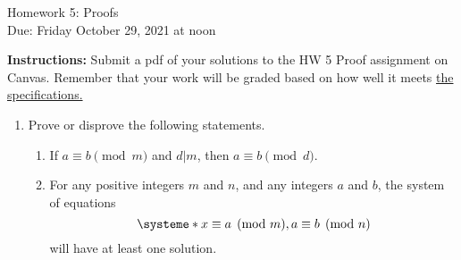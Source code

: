 \documentclass[10pt,a4paper]{article}
\begin{document}
\begin{center}
{\Large Homework 5: Proofs}\\
Due: Friday October 29, 2021 at noon\\


\end{center}
{\bf Instructions:} Submit a pdf of your solutions to the HW 5 Proof assignment on Canvas. Remember that your work will be graded based on how well it meets \href{https://docs.google.com/document/d/1emM06_WRh_h941rsjtRE9fRVndJtfRKd9gyS3Fs_rFA/edit?usp=sharing}{the specifications. }

\begin{enumerate}

 \item Prove or disprove the following statements. 
 \begin{enumerate}
 \item If $a\equiv b\pmod{m}$ and $d|m$, then $a\equiv b\pmod d$. 
 \item For any positive integers $m$ and $n$,  and any integers $a$ and $b$, the system of equations $$\systeme*{x\equiv a\pmod m, a\equiv b\pmod n}$$
  will have at least one solution. 
 \end{enumerate}

\end{enumerate}
\end{document}
